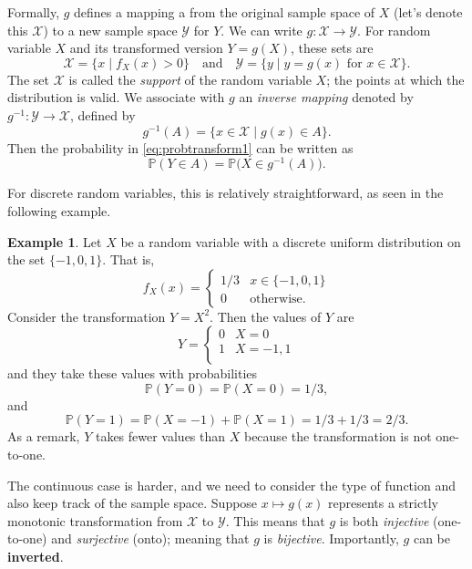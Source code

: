 \documentclass[
]{book}
\newcommand{\bbP}{\mathbb{P}}
\newcommand{\cX}{{\mathcal X}}
\newcommand{\cY}{{\mathcal Y}}
\theoremstyle{definition}
\theoremstyle{definition}
\newtheorem{example}{Example}[chapter]
\theoremstyle{definition}
\theoremstyle{definition}
\theoremstyle{remark}
\begin{document}
Formally, \(g\) defines a mapping a from the original sample space of \(X\) (let's denote this \(\cX\)) to a new sample space \(\cY\) for \(Y\).
We can write \(g:\cX\to\cY\).
For random variable \(X\) and its transformed version \(Y=g(X)\), these sets are
\[
\cX = \{ x \mid f_X(x) > 0\} \hspace{1em}\text{and}\hspace{1em} \cY = \{y \mid y=g(x) \text{ for } x\in\cX \}.
\]
The set \(\cX\) is called the \emph{support} of the random variable \(X\); the points at which the distribution is valid.
We associate with \(g\) an \emph{inverse mapping} denoted by \(g^{-1}:\cY\to\cX\), defined by
\[
g^{-1}(A) = \{ x \in \cX \mid g(x) \in A \}.
\]
Then the probability in \eqref{eq:probtransform1} can be written as
\[
\bbP(Y\in A) = \bbP\big(X\in g^{-1}(A)\big).
\]

For discrete random variables, this is relatively straightforward, as seen in the following example.

\begin{example}
Let \(X\) be a random variable with a discrete uniform distribution on the set \(\{-1,0,1\}\). That is,
\[
f_X(x) = \begin{cases}
1/3 & x \in \{-1,0,1\} \\
0 & \text{otherwise.}
\end{cases}
\]
Consider the transformation \(Y=X^2\). Then the values of \(Y\) are
\[
Y = \begin{cases}
0 & X=0\\
1 & X =-1,1\\
\end{cases}
\]
and they take these values with probabilities
\[
\bbP(Y=0) = \bbP(X=0) = 1/3,
\]
and
\[
\bbP(Y=1) = \bbP(X=-1) + \bbP(X=1) = 1/3 + 1/3 = 2/3.
\]
As a remark, \(Y\) takes fewer values than \(X\) because the transformation is not one-to-one.
\end{example}

The continuous case is harder, and we need to consider the type of function and also keep track of the sample space.
Suppose \(x \mapsto g(x)\) represents a strictly monotonic transformation from \(\cX\) to \(\cY\).
This means that \(g\) is both \emph{injective} (one-to-one) and \emph{surjective} (onto); meaning that \(g\) is \emph{bijective}.
Importantly, \(g\) can be \textbf{inverted}.
\end{document}
